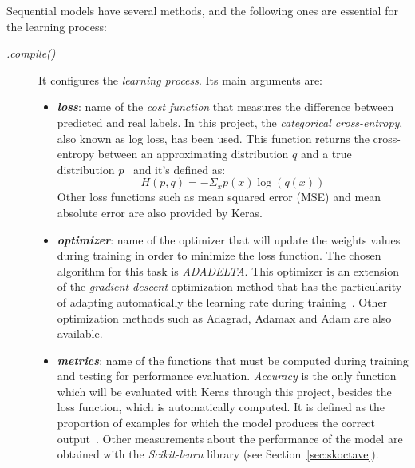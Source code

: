Sequential models have several methods, and the following ones are essential for the learning process:
\begin{description}
	\item[\textit{.compile()}] It configures the \emph{learning process}. Its main arguments are:
	\begin{itemize}
		\item \textbf{\textit{loss}}: name of the \emph{cost function} that measures the difference between predicted and real labels. In this project, the \emph{categorical cross-entropy}, also known as log loss, has been used. This function returns the cross-entropy between an approximating distribution $q$ and a true distribution $p$~\cite{theano} and it's defined as:
		\begin{equation}\label{eq:categorical_crossentropy}
		H(p,q)=-\Sigma_{x}p(x)\log(q(x))
		\end{equation}		
		Other loss functions such as mean squared error (MSE) and mean absolute error are also provided by Keras.
		
		\item \textbf{\textit{optimizer}}: name of the optimizer that will update the weights values during training in order to minimize the loss function. The chosen algorithm for this task is \emph{ADADELTA}. This optimizer is an extension of the \emph{gradient descent} optimization method that has the particularity of adapting automatically the learning rate during training~\cite{DBLP:journals/corr/abs-1212-5701}.				
		Other optimization methods such as Adagrad, Adamax and Adam are also available.
		
		\item \textbf{\textit{metrics}}: name of the functions that must be computed during training and testing for performance evaluation. \emph{Accuracy} is the only function which will be evaluated with Keras through this project, besides the loss function, which is automatically computed. It is defined as the proportion of examples for which the model produces the correct output~\cite{Goodfellow-et-al-2016}.			
		Other measurements about the performance of the model are obtained with the \emph{Scikit-learn} library (see Section~\ref{sec:skoctave}).
	\end{itemize}
\end{description}

